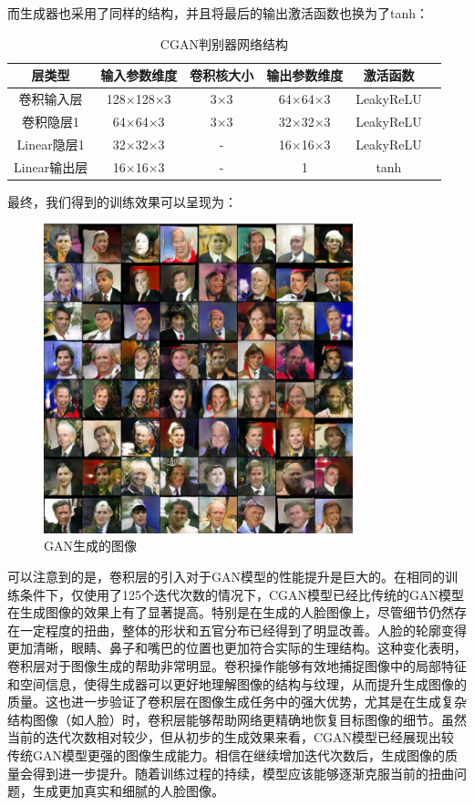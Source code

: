 \documentclass[UTF8]{ctexart}
\begin{document}
而生成器也采用了同样的结构，并且将最后的输出激活函数也换为了tanh：
\begin{table}[H]
\centering
\caption{CGAN判别器网络结构}
\label{tab:dis_cgan}
\begin{tabular}{cccccc}
\toprule[1.5pt]
\textbf{层类型} & \textbf{输入参数维度} & \textbf{卷积核大小} & \textbf{输出参数维度} & \textbf{激活函数} \\
\midrule[1.5pt]
卷积输入层 & 128$\times$128$\times$3 & 3$\times$3 & 64$\times$64$\times$3 & LeakyReLU \\
卷积隐层1 & 64$\times$64$\times$3 & 3$\times$3 & 32$\times$32$\times$3 & LeakyReLU \\
Linear隐层1 & 32$\times$32$\times$3 & - & 16$\times$16$\times$3 & LeakyReLU \\
Linear输出层 & 16$\times$16$\times$3 & - & 1 & tanh \\
\bottomrule[1.0pt]
\end{tabular}
\end{table}
最终，我们得到的训练效果可以呈现为：\par
\begin{figure}[H]
\centering
\includegraphics[width=0.8\textwidth]{./images/CGAN.png}
\caption{GAN生成的图像}
\label{fig:CGAN}
\end{figure}
可以注意到的是，卷积层的引入对于GAN模型的性能提升是巨大的。在相同的训练条件下，仅使用了125个迭代次数的情况下，CGAN模型已经比传统的GAN模型在生成图像的效果上有了显著提高。特别是在生成的人脸图像上，尽管细节仍然存在一定程度的扭曲，整体的形状和五官分布已经得到了明显改善。人脸的轮廓变得更加清晰，眼睛、鼻子和嘴巴的位置也更加符合实际的生理结构。这种变化表明，卷积层对于图像生成的帮助非常明显。卷积操作能够有效地捕捉图像中的局部特征和空间信息，使得生成器可以更好地理解图像的结构与纹理，从而提升生成图像的质量。这也进一步验证了卷积层在图像生成任务中的强大优势，尤其是在生成复杂结构图像（如人脸）时，卷积层能够帮助网络更精确地恢复目标图像的细节。虽然当前的迭代次数相对较少，但从初步的生成效果来看，CGAN模型已经展现出较传统GAN模型更强的图像生成能力。相信在继续增加迭代次数后，生成图像的质量会得到进一步提升。随着训练过程的持续，模型应该能够逐渐克服当前的扭曲问题，生成更加真实和细腻的人脸图像。
\end{document}
